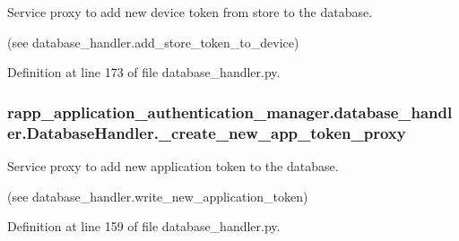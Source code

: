 Service proxy to add new device token from store to the database. 

(see database\-\_\-handler.\-add\-\_\-store\-\_\-token\-\_\-to\-\_\-device) 

Definition at line 173 of file database\-\_\-handler.\-py.

\hypertarget{classrapp__application__authentication__manager_1_1database__handler_1_1DatabaseHandler_abe0a85fff839029dd6be19ce3eda291b}{
\subsubsection[{\-\_\-create\-\_\-new\-\_\-app\-\_\-token\-\_\-proxy}]{\setlength{\rightskip}{0pt plus 5cm}rapp\-\_\-application\-\_\-authentication\-\_\-manager.\-database\-\_\-handler.\-Database\-Handler.\-\_\-create\-\_\-new\-\_\-app\-\_\-token\-\_\-proxy\hspace{0.3cm}{\ttfamily [private]}}}\label{classrapp__application__authentication__manager_1_1database__handler_1_1DatabaseHandler_abe0a85fff839029dd6be19ce3eda291b}


Service proxy to add new application token to the database. 

(see database\-\_\-handler.\-write\-\_\-new\-\_\-application\-\_\-token) 

Definition at line 159 of file database\-\_\-handler.\-py.

